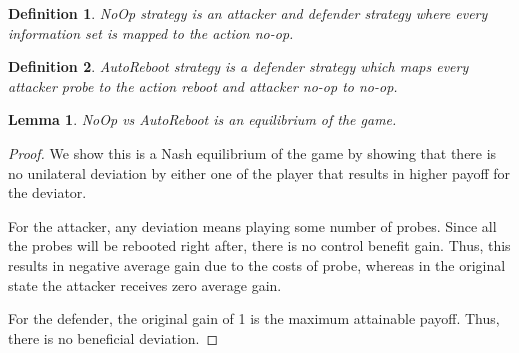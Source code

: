 \documentclass[11pt]{article}
\theoremstyle{plain}
\newtheorem{lemma}[theorem]{Lemma}
\newtheorem*{definition}{Definition}
\begin{document}
\begin{definition}
{NoOp} strategy is an attacker and defender strategy where every information set is mapped to the action {no-op}.
\end{definition}
	
\begin{definition}
{AutoReboot} strategy is a defender strategy which maps every attacker probe to the action
{reboot} and attacker {no-op} to {no-op}.
\end{definition}
	
\begin{lemma} {{NoOp} vs {AutoReboot}} is an equilibrium of the game.
\end{lemma}
\begin{proof}
    We show this is a Nash equilibrium of the game by showing that there is no unilateral deviation by either one of the player that results in higher payoff for the deviator.


    For the attacker, any deviation means playing some number of probes. Since all the probes will be rebooted right after, there is no control benefit gain. Thus, this results in negative average gain due to the costs of probe, whereas in the original state the attacker receives zero average gain.
    

    For the defender, the original gain of 1 is the maximum attainable payoff. Thus, there is no beneficial deviation.
\end{proof}
\end{document}
